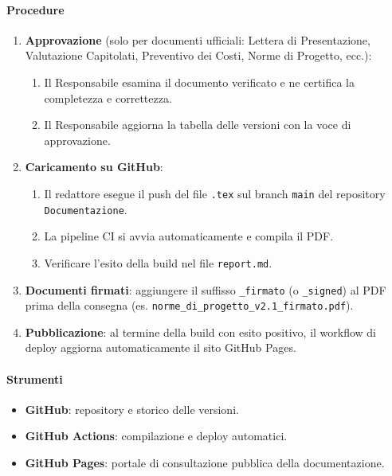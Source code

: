 \documentclass[a4paper, 11pt, oneside]{scrartcl}
\begin{document}
\paragraph{Procedure}
\begin{enumerate}
    \item \textbf{Approvazione} (solo per documenti ufficiali: Lettera di Presentazione, Valutazione Capitolati, Preventivo dei Costi, Norme di Progetto, ecc.):
    \begin{enumerate}[label=\alph*.]
        \item Il Responsabile esamina il documento verificato e ne certifica la completezza e correttezza.
        \item Il Responsabile aggiorna la tabella delle versioni con la voce di approvazione.
    \end{enumerate}
    \item \textbf{Caricamento su GitHub}:
    \begin{enumerate}[label=\alph*.]
        \item Il redattore esegue il push del file \texttt{.tex} sul branch \texttt{main} del repository \texttt{Documentazione}.
        \item La pipeline CI si avvia automaticamente e compila il PDF.
        \item Verificare l'esito della build nel file \texttt{report.md}.
    \end{enumerate}
    \item \textbf{Documenti firmati}: aggiungere il suffisso \texttt{\_firmato} (o \texttt{\_signed}) al PDF prima della consegna (es. \texttt{norme\_di\_progetto\_v2.1\_firmato.pdf}).
    \item \textbf{Pubblicazione}: al termine della build con esito positivo, il workflow di deploy aggiorna automaticamente il sito GitHub Pages.
\end{enumerate}

\paragraph{Strumenti}
\begin{itemize}
    \item \textbf{GitHub}: repository e storico delle versioni.
    \item \textbf{GitHub Actions}: compilazione e deploy automatici.
    \item \textbf{GitHub Pages}: portale di consultazione pubblica della documentazione.
\end{itemize}
\end{document}
